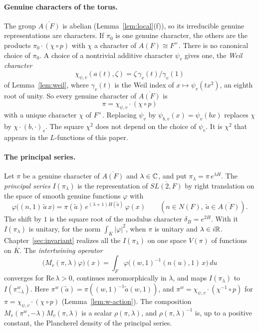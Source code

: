 \paragraph{Genuine characters of the torus.} The group $\overline{A(F)}$
is abelian (Lemma~\ref{lem:local}(f)), so its irreducible genuine
representations are characters. If $\pi_0$ is one genuine character, the
others are the products $\pi_0\cdot(\chi\circ p)$ with $\chi$ a character
of $A(F)\cong F^\times$. There is no canonical choice of $\pi_0$. A
choice of a nontrivial additive character $\psi_v$ gives one, the
\emph{Weil character}
\[
\chi_{\psi,v}(a(t),\zeta)=\zeta\,\gamma_v(t)/\gamma_v(1)
\]
of Lemma~\ref{lem:weil}, where $\gamma_v(t)$ is the Weil index of
$x\mapsto\psi_v(tx^2)$, an eighth root of unity. So every genuine
character of $\overline{A(F)}$ is
\[
\pi=\chi_{\psi,v}\cdot(\chi\circ p)
\]
with a unique character $\chi$ of $F^\times$. Replacing $\psi_v$ by
$\psi_{b,v}(x)=\psi_v(bx)$ replaces $\chi$ by $\chi\cdot(b,\cdot)_v$. The
square $\chi^2$ does not depend on the choice of $\psi_v$. It is $\chi^2$
that appears in the $L$-functions of this paper.

\paragraph{The principal series.} Let $\pi$ be a genuine character of
$\overline{A(F)}$ and $\lambda\in\mathbb{C}$, and put $\pi_\lambda=\pi\,
e^{\lambda H}$. The \emph{principal series} $I(\pi_\lambda)$ is the
representation of $\overline{SL(2,F)}$ by right translation on the space
of smooth genuine functions $\varphi$ with
\[
\varphi\bigl((n,1)\,\tilde a\,x\bigr)=\pi(\tilde a)\,e^{(\lambda+1)H(\tilde
a)}\,\varphi(x)\qquad(n\in N(F),\ \tilde a\in\overline{A(F)}).
\]
The shift by $1$ is the square root of the modulus character
$\delta_B=e^{2H}$. With it $I(\pi_\lambda)$ is unitary, for the norm
$\int_{\overline K}|\varphi|^2$, when $\pi$ is unitary and
$\lambda\in i\mathbb{R}$. Chapter~\ref{sec:invariant} realizes all the
$I(\pi_\lambda)$ on one space $V(\pi)$ of functions on $\overline K$. The
\emph{intertwining operator}
\[
\bigl(M_v(\pi,\lambda)\varphi\bigr)(x)=\int_F\varphi\bigl((w,1)^{-1}
(n(u),1)\,x\bigr)\,du
\]
converges for $\mathrm{Re}\,\lambda>0$, continues meromorphically in
$\lambda$, and maps $I(\pi_\lambda)$ to $I(\pi^w_{-\lambda})$. Here
$\pi^w(\tilde a)=\pi((w,1)^{-1}\tilde a(w,1))$, and $\pi^w=
\chi_{\psi,v}\cdot(\chi^{-1}\circ p)$ for $\pi=\chi_{\psi,v}\cdot(\chi
\circ p)$ (Lemma~\ref{lem:w-action}). The composition $M_v(\pi^w,-\lambda)
M_v(\pi,\lambda)$ is a scalar $\rho(\pi,\lambda)$, and
$\rho(\pi,\lambda)^{-1}$ is, up to a positive constant, the Plancherel
density of the principal series.

